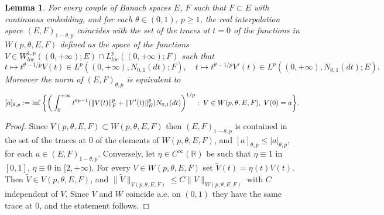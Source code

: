 \documentclass[reqno,twoside,12pt]{amsart}
\newtheorem{Lemma}[Theorem]{Lemma}
\begin{document}
\begin{Lemma}
\label{tracceGauss}
For every couple of Banach spaces $E$, $F$ such that  $F\subset E$ with continuous embedding, and for each  $\theta \in (0, 1)$, $p\geq 1$,  the real  interpolation space 
$(E, F)_{1-\theta, p}$ coincides with the set of the traces at  $t=0$ of the functions 
in $W(p, \theta, E,F)$ defined as the space of the functions 
$V\in W^{1,p}_{loc}((0, +\infty);E) \cap L^{p}_{loc}((0, +\infty);F)$ such that 
$$t\mapsto t^{\theta -1/p} V(t) \in L^{p} ((0, +\infty), N_{0,1}(dt);F), \quad t\mapsto t^{\theta -1/p} V'(t) \in L^{p} ((0, +\infty), N_{0,1}(dt);E). $$
Moreover the norm of $(E, F)_{\theta, p}$ is equivalent to 
$$ 
[a]_{\theta, p}  := \inf\bigg\{   \bigg({\displaystyle} \int_{0}^{+\infty} t ^{\theta p-1 } (\| V(t) \|_{F}^p+  \| V'(t) \|_{E}^p)N_{0,1}(dt)\bigg)^{1/p} :\; V\in W(p, \theta, E,F), \;V(0)=a\bigg\}. 
$$
\end{Lemma}
\begin{proof} Since $V(p, \theta, E,F)\subset W(p, \theta, E,F)$ then $(E, F)_{1-\theta, p}$ is contained in the set of the traces at $0$ of the elements of $W(p, \theta, E,F)$, and $[a]_{\theta, p} \leq  |a|_{\theta, p}$, for each $a\in (E, F)_{1-\theta, p}$. Conversely, let $\eta \in C^{\infty}({\mathbb R})$ be such that $\eta \equiv 1$ in $[0, 1]$, $\eta \equiv 0$ in $[2, +\infty)$. For every $V\in W(p, \theta, E,F)$ set $\widetilde{V}(t) = \eta (t)V(t)$. Then $\widetilde{V}\in V(p, \theta, E,F)$, and 
$\|\widetilde{V}\|_{V(p, \theta, E,F)} \leq C\|V\|_{W(p, \theta, E,F)}$ with $C$ independent of $V$. Since $V$ and $W$ coincide a.e. on $(0, 1)$ they have the same trace at $0$, and the statement follows. 
\end{proof}
\end{document}
